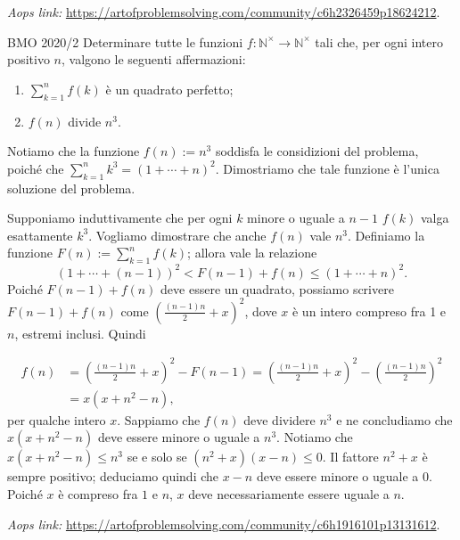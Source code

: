 \documentclass{article}
\begin{document}
\vspace{0.5cm}
\textit{Aops link:}
\href{https://artofproblemsolving.com/community/c6h2326459p18624212}
{https://artofproblemsolving.com/community/c6h2326459p18624212}.

\begin{proposition}{BMO 2020/2}{}
	Determinare tutte le funzioni
	$f:\mathbb{N^{\times}}\rightarrow\mathbb{N^{\times}}$ tali che, per ogni
	intero positivo $n$, valgono le seguenti affermazioni:
	\begin{enumerate}
		\item $ \sum_{k=1}^{n} f(k) $ è un quadrato perfetto;
		\item $f(n)$ divide $n^3$.
	\end{enumerate}
\end{proposition}

Notiamo che la funzione $f(n):=n^3$ soddisfa le considizioni
del problema, poiché che $\sum_{k=1}^n k^3=(1+\cdots+n)^2$.
Dimostriamo che tale funzione è l'unica soluzione del problema.

Supponiamo induttivamente che per ogni $k$ minore o uguale a $n-1$
$f(k)$ valga esattamente $k^3$. Vogliamo dimostrare che
anche $f(n)$ vale $n^3$. Definiamo la funzione $F(n):=\sum_{k=1}^n f(k)$;
allora vale la relazione
\begin{equation*}
	(1+\cdots+(n-1))^2<F(n-1)+f(n)\le (1+\cdots+n)^2.
\end{equation*}
Poiché $F(n-1)+f(n)$ deve essere un quadrato,
possiamo scrivere $F(n-1)+f(n)$ come $\left(\frac{(n-1)n}{2}+x\right)^2$, dove
$x$ è un intero compreso fra 1 e $n$, estremi inclusi. Quindi

\begin{align*}
	f(n) &=\left( \frac{(n-1)n}{2}+x \right) ^2-F(n-1)
	=\left( \frac{(n-1)n}{2}+x \right)^2 - \left( \frac{(n-1)n}{2} \right)^2 \\
		  &= x(x+n^2-n),
\end{align*}
per qualche intero $x$. Sappiamo che $f(n)$ deve dividere $n^3$ e ne concludiamo
che $x(x+n^2-n)$ deve essere minore o uguale a $n^3$. Notiamo che
$x(x+n^2-n)\le n^3$ se e solo se $(n^2+x)(x-n)\le 0$. Il fattore $n^2+x$ è
sempre positivo; deduciamo quindi che $x-n$ deve essere minore o uguale a 0.
Poiché $x$ è compreso fra $1$ e $n$, $x$ deve necessariamente essere uguale a $n$.


\vspace{0.5cm}
\textit{Aops link:}
\href{https://artofproblemsolving.com/community/c6h1916101p13131612}
{https://artofproblemsolving.com/community/c6h1916101p13131612}.
\end{document}
